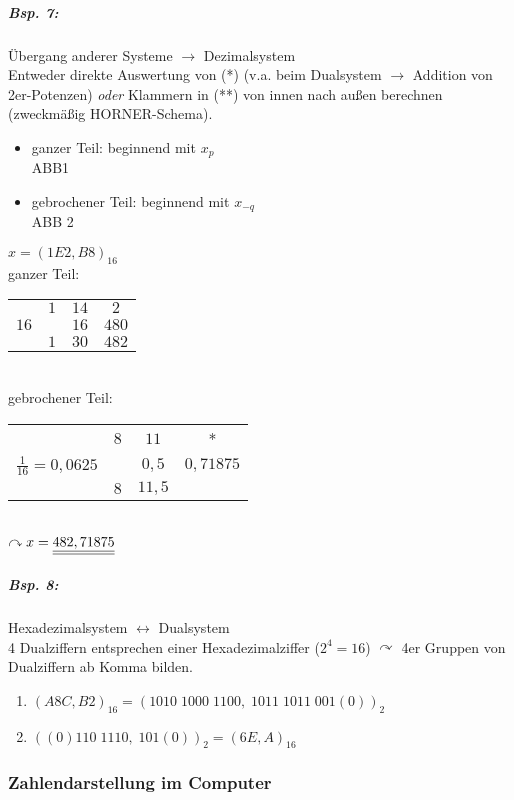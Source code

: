 \subparagraph{Bsp. 7:} Übergang anderer Systeme $\rightarrow$ Dezimalsystem\\
Entweder direkte Auswertung von (*) (v.a. beim Dualsystem $\rightarrow$ Addition von 2er-Potenzen) \emph{oder} Klammern in (**) von innen nach außen berechnen (zweckmäßig HORNER-Schema).
\begin{itemize}
\item ganzer Teil: beginnend mit $x_p$\\
ABB1 
\item gebrochener Teil: beginnend mit $x_{-q}$\\
ABB 2
\end{itemize}
$x=(1E2,B8)_{16}$\\
ganzer Teil:\\
\begin{tabular}{c | c c c}
 & $1$  &  $14$  & $2$\\
 $16$  &   & $16$  & $480$\\
 \hline
  & $1$ & $30$ & $\boxed{482}$\\

\end{tabular}\\
gebrochener Teil:\\
\begin{tabular}{c | c c c}
 & $8$  &  $11$  & *\\
 $\frac{1}{16}=0,0625$  &   & $0,5$  & $\boxed{0,71875}$\\
 \hline
  & $8$ & $11,5$ & \\
\end{tabular}\\
$\curvearrowright x=\underline{\underline{482,71875}}$

\subparagraph{Bsp. 8:} Hexadezimalsystem $\leftrightarrow$ Dualsystem\\
4 Dualziffern entsprechen einer Hexadezimalziffer ($2^4=16$) $\curvearrowright$ 4er Gruppen von Dualziffern ab Komma bilden.
\begin{enumerate}[label=\alph*.)]
\item $(A8C,B2)_{16}=(1010 \; 1000 \; 1100, \; 1011 \; 1011 \; 001(0))_2$
\item $((0)110\; 1110, \; 101(0))_2 = (6E,A)_{16}$
\end{enumerate}

\subsubsection{Zahlendarstellung im Computer}

